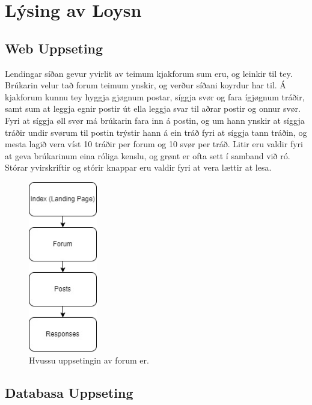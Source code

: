 \documentclass{article}
\begin{document}
\section{Lýsing av Loysn}

\subsection{Web Uppseting}
\par Lendingar síðan gevur yvirlit av teimum kjakforum sum eru, og leinkir til tey. Brúkarin
velur tað forum teimum ynskir, og verður síðani koyrdur har til. Á kjakforum kunnu tey
hyggja gjøgnum postar, síggja svør og fara ígjøgnum tráðir, samt sum at leggja egnir postir
út ella leggja svar til aðrar postir og onnur svør. Fyri at síggja øll svør má brúkarin fara inn
á postin, og um hann ynskir at síggja tráðir undir svørum til postin trýstir hann á ein tráð
fyri at síggja tann tráðin, og mesta lagið vera víst 10 tráðir per forum og 10 svør per tráð.
Litir eru valdir fyri at geva brúkarinum eina róliga kenslu, og grønt er ofta sett í samband
við ró. Stórar yvirskriftir og stórir knappar eru valdir fyri at vera lættir at lesa. 


\begin{figure}[H]
    \centering
    \includegraphics[width=3cm]{Structure.jpg} 
    \caption{Hvussu uppsetingin av forum er.} 
  \end{figure}

\subsection{Databasa Uppseting}
\end{document}
